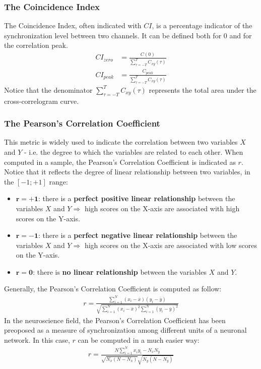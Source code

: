 \subsubsection{The Coincidence Index}
The Coincidence Index, often indicated with \(CI\), is a percentage indicator of the
synchronization level between two channels. It can be defined both for 0 and for
the correlation peak.
\begin{align*}
    CI_{zero} & = \frac{C(0)}{\sum_{\tau=-T}^{T}C_{xy}(\tau)}     \\
    CI_{peak} & = \frac{C_{peak}}{\sum_{\tau=-T}^{T}C_{xy}(\tau)}
\end{align*}
Notice that the denominator \(\sum_{\tau=-T}^{T}C_{xy}(\tau)\) represents the total
area under the cross-correlogram curve.

\subsubsection{The Pearson's Correlation Coefficient}
This metric is widely used to indicate the correlation between two variables \(X\)
and \(Y\) - i.e. the degree to which the variables are related to each other.
When computed in a sample, the Pearson's Correlation Coefficient is indicated as \(r\).
Notice that it reflects the degree of linear relationship between two variables,
in the \([-1;+1]\) range:
\begin{itemize}
    \item \(\mathbf{r=+1}\): there is a \textbf{perfect positive linear
              relationship} between the variables \(X\) and \(Y\Rightarrow\) high scores on
          the X-axis are associated with high scores on the Y-axis.
    \item \(\mathbf{r=-1}\): there is a \textbf{perfect negative linear
              relationship} between the variables \(X\) and \(Y\Rightarrow\) high scores on
          the X-axis are associated with low scores on the Y-axis.
    \item \(\mathbf{r=0}\): there is \textbf{no linear
              relationship} between the variables \(X\) and \(Y\).
\end{itemize}
Generally, the Pearson's Correlation Coefficient is computed as follow:
\begin{align*}
    r=\frac{\sum_{i=1}^{N}(x_i-\overline{x})(y_i-\overline{y})}{\sqrt{\sum_{i=1}^{N}(x_i-\overline{x})^2\sum_{i=1}^{N}(y_i-\overline{y})^2}}
\end{align*}
In the neuroscience field, the Pearson's Correlation Coefficient has been preoposed
as a measure of synchronization among different units of a neuronal network.
In this case, \(r\) can be computed in a much easier way:
\begin{align*}
    r=\frac{N\sum_{i=1}^{N}x_{i}y_{i}-N_{x}N_{y}}{\sqrt{N_{x}(N-N_{x})}\sqrt{N_{y}(N-N_{y})}}
\end{align*}


